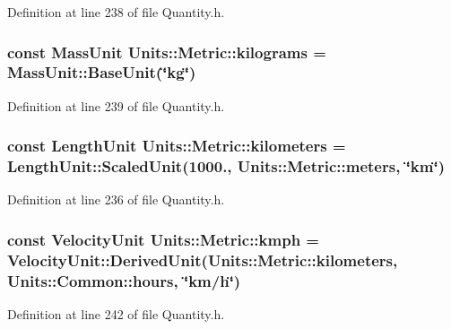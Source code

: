 Definition at line 238 of file Quantity.\+h.

\hypertarget{class_units_1_1_metric_a99628d80b8989197ae87ed949d06a89a}{
\subsubsection[{kilograms}]{\setlength{\rightskip}{0pt plus 5cm}const {\bf Mass\+Unit} Units\+::\+Metric\+::kilograms = {\bf Mass\+Unit\+::\+Base\+Unit}(\char`\"{}kg\char`\"{})\hspace{0.3cm}{\ttfamily [static]}}}\label{class_units_1_1_metric_a99628d80b8989197ae87ed949d06a89a}


Definition at line 239 of file Quantity.\+h.

\hypertarget{class_units_1_1_metric_a75f22b48abbb71b6fa08adf183565a9a}{
\subsubsection[{kilometers}]{\setlength{\rightskip}{0pt plus 5cm}const {\bf Length\+Unit} Units\+::\+Metric\+::kilometers = {\bf Length\+Unit\+::\+Scaled\+Unit}(1000., {\bf Units\+::\+Metric\+::meters}, \char`\"{}km\char`\"{})\hspace{0.3cm}{\ttfamily [static]}}}\label{class_units_1_1_metric_a75f22b48abbb71b6fa08adf183565a9a}


Definition at line 236 of file Quantity.\+h.

\hypertarget{class_units_1_1_metric_ae1c8538c908650861579c9ac0b66457d}{
\subsubsection[{kmph}]{\setlength{\rightskip}{0pt plus 5cm}const {\bf Velocity\+Unit} Units\+::\+Metric\+::kmph = {\bf Velocity\+Unit\+::\+Derived\+Unit}({\bf Units\+::\+Metric\+::kilometers}, {\bf Units\+::\+Common\+::hours}, \char`\"{}km/{\bf h}\char`\"{})\hspace{0.3cm}{\ttfamily [static]}}}\label{class_units_1_1_metric_ae1c8538c908650861579c9ac0b66457d}


Definition at line 242 of file Quantity.\+h.

